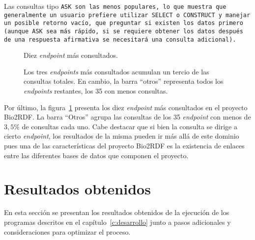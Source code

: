 Las consultas tipo \tt{ASK} son las menos populares, lo que muestra que
generalmente un usuario prefiere utilizar \tt{SELECT} o \tt{CONSTRUCT} y manejar
un posible retorno vacío, que preguntar si existen los datos primero (aunque
\tt{ASK} sea más rápido, si se requiere obtener los datos después de una
respuesta afirmativa se necesitará una consulta adicional).

\begin{figure}[h!]
  \caption{Diez \emph{endpoint} más consultados.}\label{fig:t10endp}
  \vspace{-.2cm}
  \caption*{\small
    Los tres \emph{endpoints} más consultados acumulan un tercio de las
    consultas totales. En cambio, la barra ``otros'' representa todos los
    \emph{endpoints} restantes, los 35 con menos consultas.
  }
\end{figure}

Por último, la figura~\ref{fig:t10endp} presenta los diez \emph{endpoint} más
consultados en el proyecto Bio2RDF. La barra ``Otros'' agrupa las consultas de
los 35 \emph{endpoint} con menos de $3,5\%$ de consultas cada uno. Cabe destacar
que si bien la consulta se dirige a cierto \emph{endpoint}, los resultados de la
misma pueden ir más allá de este dominio pues una de las características del
proyecto Bio2RDF es la existencia de enlaces entre las diferentes bases de datos
que componen el proyecto.

\section{Resultados obtenidos}\label{sec:res}
En esta sección se presentan los resultados obtenidos de la ejecución de los
programas descritos en el capítulo~\ref{c:desarrollo} junto a pasos 
adicionales y consideraciones para optimizar el proceso.

